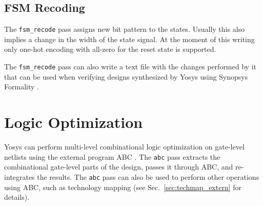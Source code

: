 \subsection{FSM Recoding}

The {\tt fsm\_recode} pass assigns new bit pattern to the states. Usually this
also implies a change in the width of the state signal. At the moment of this
writing only one-hot encoding with all-zero for the reset state is supported.

The {\tt fsm\_recode} pass can also write a text file with the changes performed
by it that can be used when verifying designs synthesized by Yosys using Synopsys
Formality .

\section{Logic Optimization}

Yosys can perform multi-level combinational logic optimization on gate-level netlists using the
external program ABC . The {\tt abc} pass extracts the combinational gate-level
parts of the design, passes it through ABC, and re-integrates the results. The {\tt abc} pass
can also be used to perform other operations using ABC, such as technology mapping (see
Sec.~\ref{sec:techmap_extern} for details).

